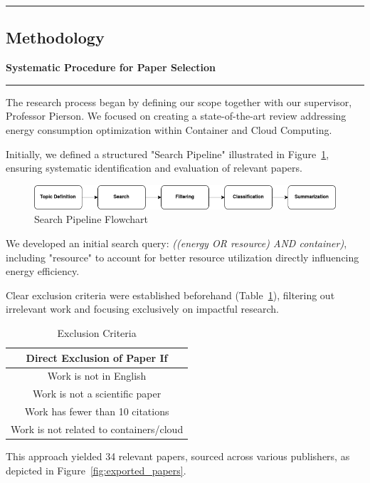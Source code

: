 {\color{gray}\hrule}
\begin{center}
\section{Methodology}
\textbf{Systematic Procedure for Paper Selection}
\bigskip
\end{center}
{\color{gray}\hrule}
\begin{multicols}{2}
The research process began by defining our scope together with our supervisor, Professor Pierson. We focused on creating a state-of-the-art review addressing energy consumption optimization within Container and Cloud Computing.

Initially, we defined a structured "Search Pipeline" illustrated in Figure~\ref{fig:search_pipeline}, ensuring systematic identification and evaluation of relevant papers.

\begin{figure}[H]
    \centering
    \includegraphics[width=0.7\columnwidth]{flowchartTIR.png}
    \caption{Search Pipeline Flowchart}
    \label{fig:search_pipeline}
\end{figure}

We developed an initial search query: \textit{((energy OR resource) AND container)}, including "resource" to account for better resource utilization directly influencing energy efficiency.

Clear exclusion criteria were established beforehand (Table~\ref{tab:Exclusion Rules}), filtering out irrelevant work and focusing exclusively on impactful research.

\begin{table}[H]
\centering
\begin{tabular}{c}
\hline
Direct Exclusion of Paper If \\ \hline
Work is not in English \\ 
Work is not a scientific paper \\ 
Work has fewer than 10 citations \\ 
Work is not related to containers/cloud \\ \hline
\end{tabular}
    \caption{Exclusion Criteria}
    \label{tab:Exclusion Rules}
\end{table}

This approach yielded 34 relevant papers, sourced across various publishers, as depicted in Figure~\ref{fig:exported_papers}.


\end{multicols}
